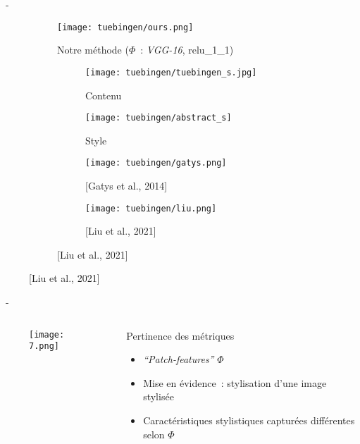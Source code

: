 \documentclass[aspectratio=169, 22pt]{beamer}
\begin{document}
\begin{frame}{\secname~- \subsecname}
  \begin{figure}
    \begin{subfigure}{0.47\linewidth}
      \texttt{[image: tuebingen/ours.png]}
      \caption{Notre méthode ($\Phi$ : \emph{VGG-16}, relu\_1\_1)}
    \end{subfigure}
    \begin{subfigure}{0.45\linewidth}
      \begin{subfigure}{0.45\linewidth}
        \texttt{[image: tuebingen/tuebingen\_s.jpg]}
        \caption{Contenu}
      \end{subfigure}
      \begin{subfigure}{0.45\linewidth}
        \texttt{[image: tuebingen/abstract\_s]}
        \caption{Style}
      \end{subfigure}

      \begin{subfigure}{0.45\linewidth}
        \texttt{[image: tuebingen/gatys.png]}
        \caption{\scriptsize[Gatys et al., 2014]}
      \end{subfigure}
      \begin{subfigure}{0.45\linewidth}
        \texttt{[image: tuebingen/liu.png]}
        \caption{[Liu et al., 2021]}
      \end{subfigure}
    \end{subfigure}
  \end{figure}
\end{frame}


\begin{frame}{\secname~- \subsecname}
  \begin{columns}
    \begin{column}{0.52\linewidth}
      \begin{figure}
        \centering
        \texttt{[image: 7.png]}
      \end{figure}
    \end{column}
    \begin{column}{0.48\linewidth}
      \begin{block}{Pertinence des métriques}
        \begin{itemize}
        \item \emph{``Patch-features''} $\Phi$
        \item Mise en évidence : stylisation d'une image stylisée
        \item Caractéristiques stylistiques capturées différentes selon $\Phi$
        \end{itemize}
      \end{block}
    \end{column}
  \end{columns}
\end{frame}
\end{document}
